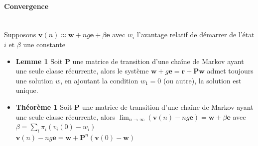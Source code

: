 \documentclass[paper=a4,fontsize=8pt,pagesize,DIV=calc]{scrartcl}
\newcounter{row}
\begin{document}
\begin{multicols}{3}
\paragraph{Convergence}~~\\
Supposons $\bm{v}(n)\approx \bm{w}+ng \bm{e}+\beta \bm{e}$ avec $w_i$ l'avantage relatif de démarrer de l'état $i$ et $\beta$ une constante
\begin{itemize}
\item \textbf{Lemme 1} Soit $\bm{P}$ une matrice de transition d’une chaîne de Markov ayant une seule classe récurrente, alors le système $\bm{w} + g\bm{e} = \bm{r} + \bm{Pw}$ admet toujours une solution $w$, en ajoutant la condition $w_1 = 0$ (ou autre), la solution est unique.
\item \textbf{Théorème 1} Soit $\bm{P}$ une matrice de transition d’une chaîne de Markov ayant une seule classe récurrente, alors 
$\lim_{n\rightarrow \infty}(\bm{v}(n) - ng\bm{e}) = \bm{w} + \beta\bm{e}$ avec $\beta =\sum_i \pi_i (v_i(0) - w_i)$
\\ $\bm{v}(n)-ng\bm{e}=\bm{w}+\bm{P}^n(\bm{v}(0)-\bm{w})$
\end{itemize}

\end{multicols}
\end{document}
